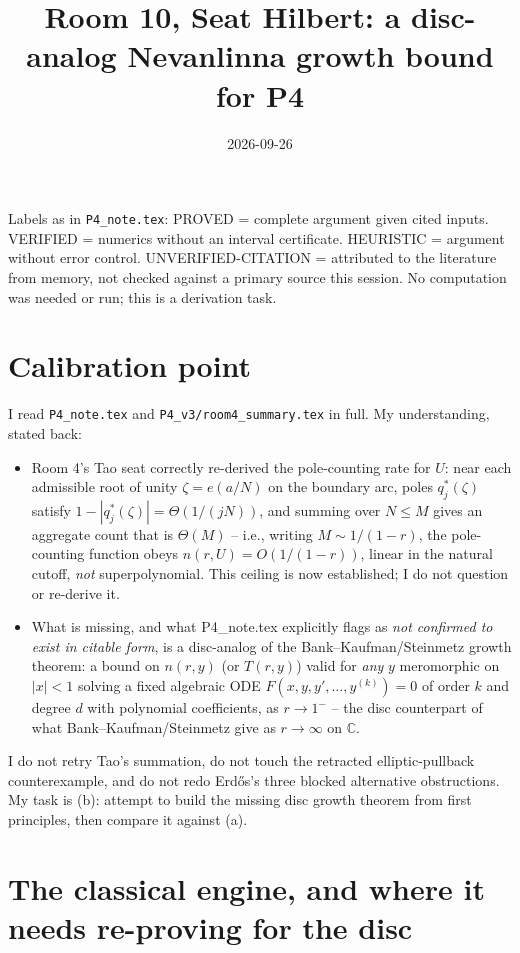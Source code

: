 \documentclass[11pt]{article}
\title{Room 10, Seat Hilbert: a disc-analog Nevanlinna growth bound for P4}
\date{2026-09-26}
\theoremstyle{remark}
\newcommand{\C}{\mathbb C}
\begin{document}
\maketitle

\noindent Labels as in \texttt{P4\_note.tex}: PROVED = complete argument given cited inputs.
VERIFIED = numerics without an interval certificate. HEURISTIC = argument without error control.
UNVERIFIED-CITATION = attributed to the literature from memory, not checked against a primary
source this session. No computation was needed or run; this is a derivation task.

\section*{Calibration point}

I read \texttt{P4\_note.tex} and \texttt{P4\_v3/room4\_summary.tex} in full. My understanding,
stated back:

\begin{itemize}
\item[(a)] Room 4's Tao seat correctly re-derived the pole-counting rate for $U$: near each
admissible root of unity $\zeta=e(a/N)$ on the boundary arc, poles $q^\ast_j(\zeta)$ satisfy
$1-|q^\ast_j(\zeta)|=\Theta(1/(jN))$, and summing over $N\le M$ gives an aggregate count that is
$\Theta(M)$ -- i.e., writing $M\sim1/(1-r)$, the pole-counting function obeys
$n(r,U)=O(1/(1-r))$, linear in the natural cutoff, \emph{not} superpolynomial. This ceiling is
now established; I do not question or re-derive it.
\item[(b)] What is missing, and what P4\_note.tex explicitly flags as \emph{not confirmed to
exist in citable form}, is a disc-analog of the Bank--Kaufman/Steinmetz growth theorem: a bound on
$n(r,y)$ (or $T(r,y)$) valid for \emph{any} $y$ meromorphic on $|x|<1$ solving a fixed algebraic
ODE $F(x,y,y',\ldots,y^{(k)})=0$ of order $k$ and degree $d$ with polynomial coefficients, as
$r\to1^-$ -- the disc counterpart of what Bank--Kaufman/Steinmetz give as $r\to\infty$ on $\C$.
\end{itemize}

I do not retry Tao's summation, do not touch the retracted elliptic-pullback counterexample, and
do not redo Erd\H os's three blocked alternative obstructions. My task is (b): attempt to build the
missing disc growth theorem from first principles, then compare it against (a).

\section{The classical engine, and where it needs re-proving for the disc}\label{sec:engine}
\end{document}
